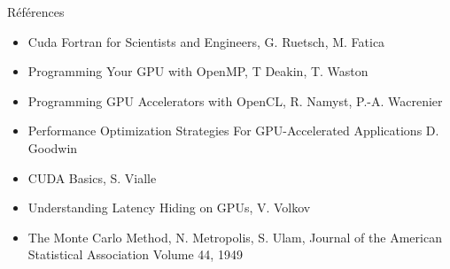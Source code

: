 \documentclass[11pt,mathserif]{beamer}
\newcommand{\Pdf}{\faFilePdfO}
\newcommand{\liburu}{\faBook}
\newif\ifC
\newcommand{\mylang}{c}
\newcommand{\extlang}{c}
\newcommand{\extcu}{cu}
\newcommand{\mylang}{fortran}
\newcommand{\extlang}{f90}
\newcommand{\extcu}{cuf}
\newcommand{\includeSrc}[1]{}
\newcommand{\includeSrcCu}[1]{}
\begin{document}


\begin{frame}{Références}
\begin{itemize}[<+->]
  \item[\liburu] Cuda Fortran for Scientists and Engineers, G. Ruetsch, M. Fatica
  \item[\liburu] Programming Your GPU with OpenMP, T Deakin, T. Waston
  \item[\Pdf] Programming GPU Accelerators with OpenCL, R. Namyst, P.-A. Wacrenier \href{https://raymond-namyst.emi.u-bordeaux.fr/ens/pap/PAP-GPU.pdf}{}
  \item[\Pdf] Performance Optimization Strategies For GPU-Accelerated Applications D. Goodwin \href{https://on-demand.gputechconf.com/gtc/2013/presentations/S3046-Performance-Optimization-Strategies-for-GPU-Accelerated-Apps.pdf}{}
  \item[\faFilePowerpointO] CUDA Basics, S. Vialle \href{http://www.metz.supelec.fr/metz/personnel/vialle/course/PPS-5A-GPGPU/notes-de-cours-specifiques/PPS-GPU-02-CUDA-Basics-2spp.pdf}{}
  \item[\Pdf] Understanding Latency Hiding on GPUs, V. Volkov \href{http://www2.eecs.berkeley.edu/Pubs/TechRpts/2016/EECS-2016-143.pdf}{}
  \item[\Pdf] The Monte Carlo Method, N. Metropolis, S. Ulam,  Journal of the American Statistical Association Volume 44, 1949 
    \href{http://www.tandfonline.com/doi/abs/10.1080/01621459.1949.10483310}{}
\end{itemize}
\end{frame}
\end{document}
